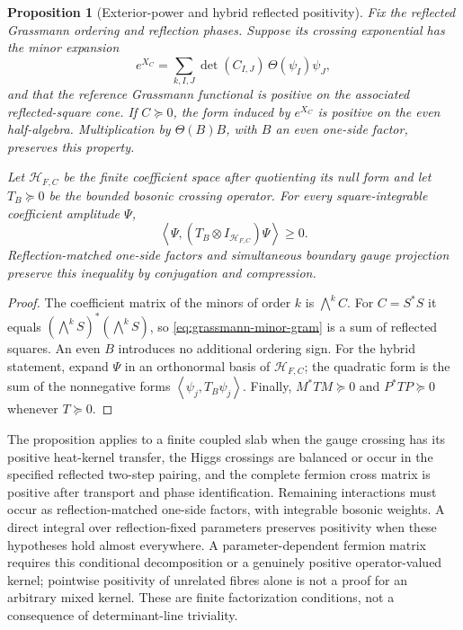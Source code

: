 \documentclass[11pt,a4paper,oneside]{book}
\theoremstyle{plain}
\newtheorem{proposition}[theorem]{Proposition}
\theoremstyle{definition}
\theoremstyle{remark}
\newcommand{\HH}{\mathcal H}
\newcommand{\pair}[2]{\left\langle#1,#2\right\rangle}
\newcommand{\src}[2]{\cite{#1}}
\begin{document}
\begin{proposition}[Exterior-power and hybrid reflected positivity]
\label{prop:hybrid-rp}
Fix the reflected Grassmann ordering and reflection phases.  Suppose its
crossing exponential has the minor expansion
\begin{equation}
 e^{X_C}=\sum_{k,I,J}\det(C_{I,J})\,
                         \Theta(\psi_I)\psi_J,
 \label{eq:grassmann-minor-gram}
\end{equation}
and that the reference Grassmann functional is positive on the associated
reflected-square cone.  If $C\succeq0$, the form induced by $e^{X_C}$ is
positive on the even half-algebra.  Multiplication by
$\Theta(B)B$, with $B$ an even one-side factor, preserves this property.

Let $\HH_{F,C}$ be the finite coefficient space after quotienting its
null form and let $T_B\succeq0$ be the bounded bosonic crossing operator.
For every square-integrable coefficient amplitude $\Psi$,
\begin{equation}
 \pair{\Psi}{(T_B\otimes I_{\HH_{F,C}})\Psi}\ge0.
 \label{eq:hybrid-rp}
\end{equation}
Reflection-matched one-side factors and simultaneous boundary gauge
projection preserve this inequality by conjugation and compression.
\end{proposition}
\begin{proof}
The coefficient matrix of the minors of order $k$ is $\bigwedge^kC$.
For $C=S^*S$ it equals
$(\bigwedge^kS)^*(\bigwedge^kS)$, so
\eqref{eq:grassmann-minor-gram} is a sum of reflected squares.  An even
$B$ introduces no additional ordering sign.  For the hybrid statement,
expand $\Psi$ in an orthonormal basis of $\HH_{F,C}$; the quadratic form
is the sum of the nonnegative forms $\pair{\psi_j}{T_B\psi_j}$.
Finally, $M^*TM\succeq0$ and $P^*TP\succeq0$ whenever $T\succeq0$.
\end{proof}
\src{R19}{thm:v19v7-gram,thm:v19v16-hybrid,thm:v19v16-coupled}

The proposition applies to a finite coupled slab when the gauge crossing
has its positive heat-kernel transfer, the Higgs crossings are balanced
or occur in the specified reflected two-step pairing, and the complete
fermion cross matrix is positive after transport and phase identification.
Remaining interactions must occur as reflection-matched one-side factors,
with integrable bosonic weights.  A direct integral over reflection-fixed
parameters preserves positivity when these hypotheses hold almost
everywhere.  A parameter-dependent fermion matrix requires this
conditional decomposition or a genuinely positive operator-valued
kernel; pointwise positivity of unrelated fibres alone is not a proof
for an arbitrary mixed kernel.  These are finite factorization
conditions, not a consequence of determinant-line triviality.
\end{document}
